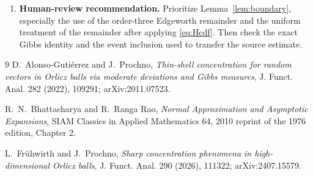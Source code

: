\documentclass[11pt]{article}
\begin{document}
\begin{enumerate}[leftmargin=*,itemsep=0.55em]
\item \textbf{Human-review recommendation.}  Prioritize
Lemma~\ref{lem:boundary}, especially the use of the order-three Edgeworth
remainder and the uniform treatment of the remainder after applying
\eqref{eq:Hcdf}.  Then check the exact Gibbs identity and the event inclusion
used to transfer the source estimate.
\end{enumerate}

\begin{thebibliography}{9}
D.~Alonso-Guti\'errez and J.~Prochno,
\emph{Thin-shell concentration for random vectors in Orlicz balls via
moderate deviations and Gibbs measures}, J. Funct. Anal. 282 (2022), 109291;
arXiv:2011.07523.

R.~N.~Bhattacharya and R.~Ranga Rao,
\emph{Normal Approximation and Asymptotic Expansions}, SIAM Classics in
Applied Mathematics 64, 2010 reprint of the 1976 edition, Chapter 2.

L.~Fr\"uhwirth and J.~Prochno,
\emph{Sharp concentration phenomena in high-dimensional Orlicz balls},
J. Funct. Anal. 290 (2026), 111322; arXiv:2407.15579.
\end{thebibliography}
\end{document}
